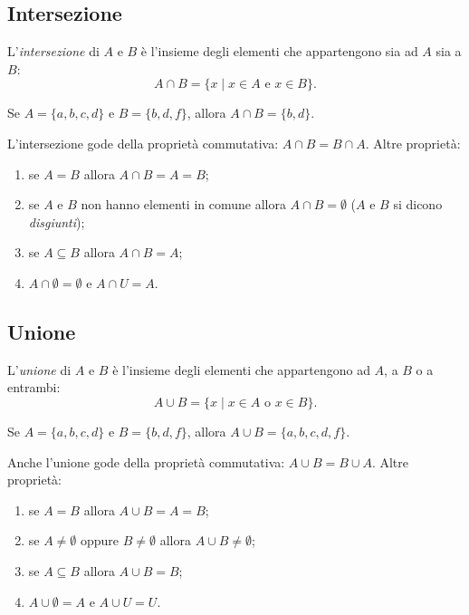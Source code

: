 \documentclass[11pt,a4paper]{article}
\begin{document}
\subsection{Intersezione}

\begin{definizione}
L'\emph{intersezione} di $A$ e $B$ è l'insieme degli elementi che
appartengono sia ad $A$ sia a $B$:
\[
A \cap B = \{x \mid x \in A \text{ e } x \in B\}.
\]
\end{definizione}

\begin{esempio}
Se $A = \{a, b, c, d\}$ e $B = \{b, d, f\}$, allora $A \cap B = \{b, d\}$.
\end{esempio}

L'intersezione gode della proprietà commutativa: $A \cap B = B \cap A$.
Altre proprietà:
\begin{enumerate}
    \item se $A = B$ allora $A \cap B = A = B$;
    \item se $A$ e $B$ non hanno elementi in comune allora $A \cap B = \emptyset$ ($A$ e $B$ si dicono \emph{disgiunti});
    \item se $A \subseteq B$ allora $A \cap B = A$;
    \item $A \cap \emptyset = \emptyset$ e $A \cap U = A$.
\end{enumerate}
\subsection{Unione}

\begin{definizione}
L'\emph{unione} di $A$ e $B$ è l'insieme degli elementi che appartengono
ad $A$, a $B$ o a entrambi:
\[
A \cup B = \{x \mid x \in A \text{ o } x \in B\}.
\]
\end{definizione}

\begin{esempio}
Se $A = \{a, b, c, d\}$ e $B = \{b, d, f\}$, allora
$A \cup B = \{a, b, c, d, f\}$.
\end{esempio}

Anche l'unione gode della proprietà commutativa: $A \cup B = B \cup A$.
Altre proprietà:
\begin{enumerate}
    \item se $A = B$ allora $A \cup B = A = B$;
    \item se $A \neq \emptyset$ oppure $B \neq \emptyset$ allora $A \cup B \neq \emptyset$;
    \item se $A \subseteq B$ allora $A \cup B = B$;
    \item $A \cup \emptyset = A$ e $A \cup U = U$.
\end{enumerate}
\end{document}
